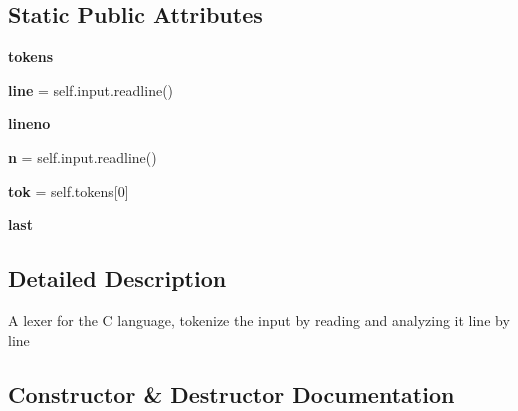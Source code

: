 \subsection*{Static Public Attributes}
\begin{DoxyCompactItemize}
\item 
\mbox{\label{classapibuild_1_1_c_lexer_a029e234cea1b4c12d03f5e457116d15e}} 
{\bfseries tokens}
\item 
\mbox{\label{classapibuild_1_1_c_lexer_a28814e4697a8cb305b8b5549899c98a3}} 
{\bfseries line} = self.\+input.\+readline()
\item 
\mbox{\label{classapibuild_1_1_c_lexer_a557d21e4b1f49db3dfec1886c6275432}} 
{\bfseries lineno}
\item 
\mbox{\label{classapibuild_1_1_c_lexer_ad275a4e7d72f9322012110627c9d53ea}} 
{\bfseries n} = self.\+input.\+readline()
\item 
\mbox{\label{classapibuild_1_1_c_lexer_a51b243931682334fec17c75acc573d57}} 
{\bfseries tok} = self.\+tokens\mbox{[}0\mbox{]}
\item 
\mbox{\label{classapibuild_1_1_c_lexer_a1443810ac44596bb1b538b03b473d033}} 
{\bfseries last}
\end{DoxyCompactItemize}


\subsection{Detailed Description}
\begin{DoxyVerb}A lexer for the C language, tokenize the input by reading and
   analyzing it line by line\end{DoxyVerb}
 

\subsection{Constructor \& Destructor Documentation}
\mbox{\label{classapibuild_1_1_c_lexer_a9a072c7ed49420b911dc439e77c12512}} 
